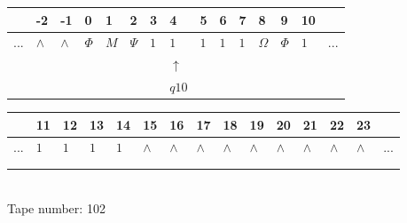 \documentclass[11pt]{article}
\begin{document}
\begin{table}[H]
\centering
\begin{tabular}{lllllllllllllll}
 & -2 & -1 & 0 & 1 & 2 & 3 & 4 & 5 & 6 & 7 & 8 & 9 & 10 & \\
\hline
$...$ & \multicolumn{1}{|l|}{$\wedge$} & \multicolumn{1}{|l|}{$\wedge$} & \multicolumn{1}{|l|}{$\Phi$} & \multicolumn{1}{|l|}{$M$} & \multicolumn{1}{|l|}{$\Psi$} & \multicolumn{1}{|l|}{$1$} & \multicolumn{1}{|l|}{$1$} & \multicolumn{1}{|l|}{$1$} & \multicolumn{1}{|l|}{$1$} & \multicolumn{1}{|l|}{$1$} & \multicolumn{1}{|l|}{$\Omega$} & \multicolumn{1}{|l|}{$\Phi$} & \multicolumn{1}{|l|}{$1$} & $...$\\
\hline
&  &  &  &  &  &  & $\uparrow$ &  &  &  &  &  &  &  \\
&  &  &  &  &  &  & $ q10 $ &  &  &  &  &  &  &  \\
\end{tabular}
\begin{tabular}{lllllllllllllll}
 & 11 & 12 & 13 & 14 & 15 & 16 & 17 & 18 & 19 & 20 & 21 & 22 & 23 & \\
\hline
$...$ & \multicolumn{1}{|l|}{$1$} & \multicolumn{1}{|l|}{$1$} & \multicolumn{1}{|l|}{$1$} & \multicolumn{1}{|l|}{$1$} & \multicolumn{1}{|l|}{$\wedge$} & \multicolumn{1}{|l|}{$\wedge$} & \multicolumn{1}{|l|}{$\wedge$} & \multicolumn{1}{|l|}{$\wedge$} & \multicolumn{1}{|l|}{$\wedge$} & \multicolumn{1}{|l|}{$\wedge$} & \multicolumn{1}{|l|}{$\wedge$} & \multicolumn{1}{|l|}{$\wedge$} & \multicolumn{1}{|l|}{$\wedge$} & $...$\\
\hline
&  &  &  &  &  &  &  &  &  &  &  &  &  &  \\
&  &  &  &  &  &  &  &  &  &  &  &  &  &  \\
\end{tabular}
\\
Tape number: 102
\noindent\makebox[\linewidth]{\hdashrule{\textwidth}{1pt}{1pt}}\end{table}
\end{document}
